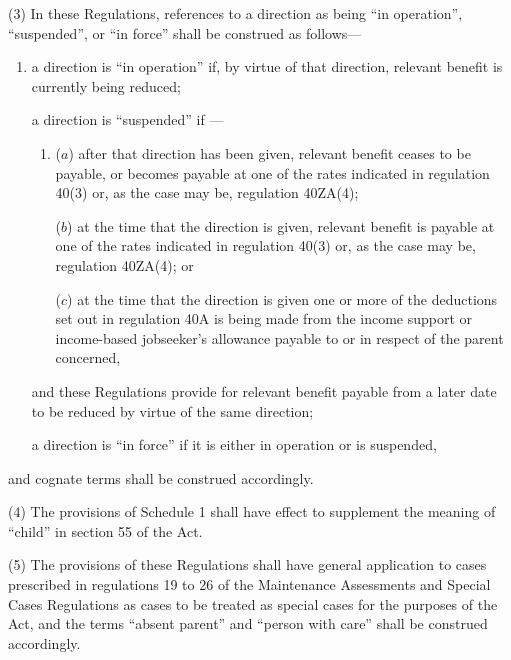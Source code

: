 \documentclass[a4paper]{article}
\begin{document}
(3) In these Regulations, references to a direction as being “in operation”, “suspended”, or “in force” shall be construed as follows—
\begin{enumerate}\item[]
a direction is “in operation” if, by virtue of that direction, relevant benefit is currently being reduced;

a direction is “suspended” if%
—
\begin{enumerate}\item[]
($a$) after that direction has been given, relevant benefit ceases to be payable, or becomes payable at one of the rates indicated in regulation 40(3)
or, as the case may be, regulation 40ZA(4);  %

($b$) at the time that the direction is given, relevant benefit is payable at one of the rates indicated in regulation 40(3)
or, as the case may be, regulation 40ZA(4);  %
or  %

($c$) at the time that the direction is given one or more of the deductions set out in regulation 40A is being made from the income support 
or income-based jobseeker’s allowance  %
payable to or in respect of the parent concerned,
\end{enumerate}
and these Regulations provide for relevant benefit payable from a later date to be reduced by virtue of the same direction;

a direction is “in force” if it is either in operation or is suspended,
\end{enumerate}
and cognate terms shall be construed accordingly.

(4) The provisions of Schedule 1 shall have effect to supplement the meaning of “child” in section 55 of the Act.

(5) The provisions of these Regulations shall have general application to cases prescribed in regulations 19 to 26 of the Maintenance Assessments and Special Cases Regulations as cases to be treated as special cases for the purposes of the Act, and the terms “absent parent” and “person with care” shall be construed accordingly.
\end{document}
